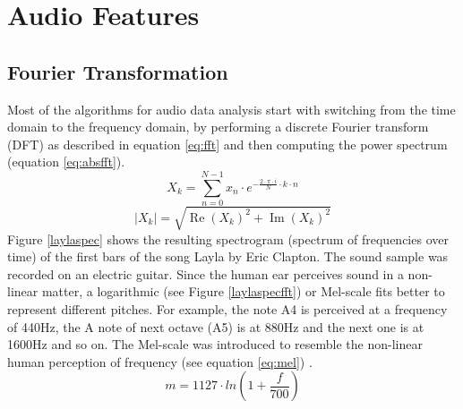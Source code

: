 \section{Audio Features}

\subsection{Fourier Transformation}\label{featsec}

Most of the algorithms for audio data analysis start with switching from the time domain to the frequency domain, by performing a discrete Fourier transform (DFT) as described in equation \eqref{eq:fft} and then computing the power spectrum (equation \eqref{eq:absfft}).
\begin{equation} \label{eq:fft}
X_k = \sum_{n=0}^{N-1}{x_n \cdot e^ { - \frac{ 2 \cdot \pi \cdot i}{N}\cdot k\cdot n}}
\end{equation}
\begin{equation} \label{eq:absfft}
|X_k| = \sqrt{\operatorname{Re}(X_k)^2 + \operatorname{Im}(X_k)^2}
\end{equation}
Figure \ref{laylaspec} shows the resulting spectrogram (spectrum of frequencies over time) of the first bars of the song Layla by Eric Clapton. The sound sample was recorded on an electric guitar. Since the human ear perceives sound in a non-linear matter, a logarithmic (see Figure \ref{laylaspecfft}) or Mel-scale fits better to represent different pitches. For example, the note A4 is perceived at a frequency of 440Hz, the A note of next octave (A5) is at 880Hz and the next one is at 1600Hz and so on. The Mel-scale was introduced to resemble the non-linear human perception of frequency (see equation \eqref{eq:mel}) \cite[pp. 53f]{knees1}.
\begin{equation} \label{eq:mel}
m = 1127 \cdot ln(1 + \frac{f}{700})
\end{equation}
